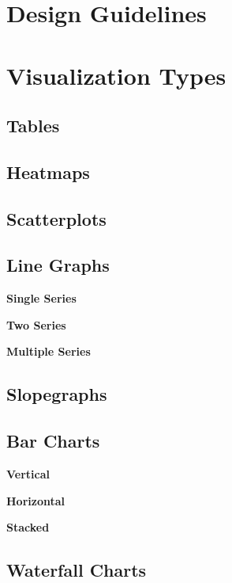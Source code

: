 \documentclass[]{book}
\begin{document}
\hypertarget{design-guidelines}{%
\section{Design Guidelines}\label{design-guidelines}}

\hypertarget{visualization-types}{%
\section{Visualization Types}\label{visualization-types}}

\hypertarget{tables}{%
\subsection{Tables}\label{tables}}

\hypertarget{heatmaps}{%
\subsection{Heatmaps}\label{heatmaps}}

\hypertarget{scatterplots}{%
\subsection{Scatterplots}\label{scatterplots}}

\hypertarget{line-graphs}{%
\subsection{Line Graphs}\label{line-graphs}}

\textbf{Single Series}

\textbf{Two Series}

\textbf{Multiple Series}

\hypertarget{slopegraphs}{%
\subsection{Slopegraphs}\label{slopegraphs}}

\hypertarget{bar-charts}{%
\subsection{Bar Charts}\label{bar-charts}}

\textbf{Vertical}

\textbf{Horizontal}

\textbf{Stacked}

\hypertarget{waterfall-charts}{%
\subsection{Waterfall Charts}\label{waterfall-charts}}
\end{document}
